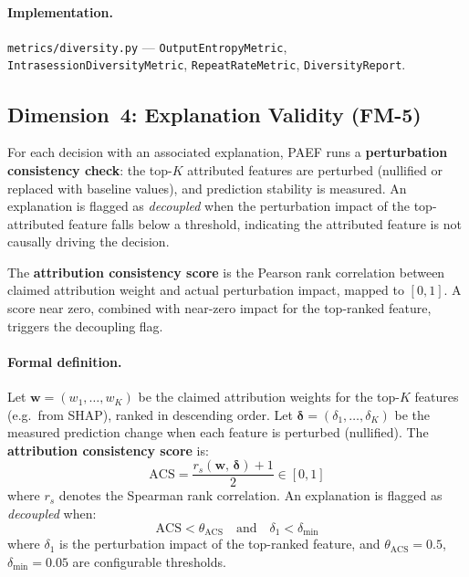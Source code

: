 \documentclass{article}
\begin{document}
\begin{sloppypar}\paragraph{Implementation.} \texttt{metrics/diversity.py} ---
\texttt{Output\-Entropy\-Metric}, \texttt{Intrasession\-Diversity\-Metric},
\texttt{Repeat\-Rate\-Metric}, \texttt{Diversity\-Report}.\end{sloppypar}

\subsection{Dimension~4: Explanation Validity (FM-5)}

For each decision with an associated explanation, PAEF runs a
\textbf{perturbation consistency check}: the top-$K$ attributed features are
perturbed (nullified or replaced with baseline values), and prediction
stability is measured.  An explanation is flagged as \emph{decoupled} when the
perturbation impact of the top-attributed feature falls below a threshold,
indicating the attributed feature is not causally driving the decision.

The \textbf{attribution consistency score} is the Pearson rank correlation
between claimed attribution weight and actual perturbation impact, mapped to
$[0, 1]$.  A score near zero, combined with near-zero impact for the
top-ranked feature, triggers the decoupling flag.

\paragraph{Formal definition.}
Let $\mathbf{w} = (w_1, \ldots, w_K)$ be the claimed attribution weights for the
top-$K$ features (e.g.\ from SHAP), ranked in descending order.  Let
$\boldsymbol{\delta} = (\delta_1, \ldots, \delta_K)$ be the measured prediction
change when each feature is perturbed (nullified).  The
\textbf{attribution consistency score} is:
\begin{equation}
  \text{ACS} = \frac{r_s(\mathbf{w},\, \boldsymbol{\delta}) + 1}{2} \in [0, 1]
\end{equation}
where $r_s$ denotes the Spearman rank correlation.  An explanation is flagged
as \emph{decoupled} when:
\begin{equation}
  \text{ACS} < \theta_{\text{ACS}} \quad \text{and} \quad \delta_1 < \delta_{\min}
\end{equation}
where $\delta_1$ is the perturbation impact of the top-ranked feature, and
$\theta_{\text{ACS}} = 0.5$, $\delta_{\min} = 0.05$ are configurable thresholds.
\end{document}
